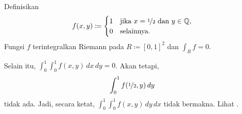\begin{example}
Definisikan
\begin{equation*}
f(x,y) \coloneqq 
\begin{cases}
1 & \text{jika } x=\nicefrac{1}{2} \text{ dan } y \in {\mathbb{Q}}, \\
0 & \text{selainnya.}
\end{cases}
\end{equation*}
Fungsi $f$ terintegralkan Riemann pada $R \coloneqq [0,1]^2$ dan
$\int_R f = 0$.

Selain itu, $\int_0^1 \int_0^1 f(x,y) \, dx \, dy = 0$. Akan tetapi,
\begin{equation*}
\int_0^1 f(\nicefrac{1}{2},y) \, dy
\end{equation*}
tidak ada. Jadi, secara ketat,
$\int_0^1 \int_0^1 f(x,y) \, dy \, dx$ tidak bermakna.
Lihat .

\begin{myfigureht}
\caption{Kiri: $[0,1]^2$ dengan garis $x=\nicefrac{1}{2}$ ditandai
bertitik-titik dan $\int_0^1 f(x,y) \, dx$ ditandai sebagai garis penuh abu-abu
untuk suatu $y$ tetap. Tengah: Diagram serupa, tetapi
$\int_0^1 f(x,y) \, dy$ ditandai untuk suatu $x \neq \nicefrac{1}{2}$.
Kanan: Tiga persegi panjang berbeda dalam partisi yang digunakan untuk
mengintegralkan $f$, masing-masing dengan corak abu-abu berbeda.\label{fig:fubinibad}}
\end{myfigureht}


\end{example}
